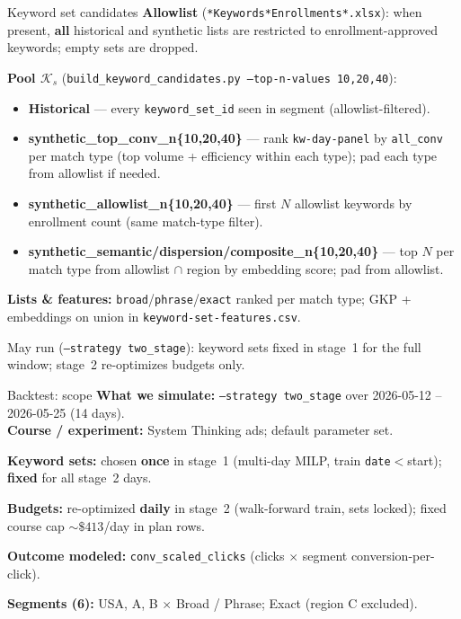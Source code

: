 \documentclass[11pt]{beamer}
\begin{document}
\begin{frame}{Keyword set candidates}
  \footnotesize
  \textbf{Allowlist} (\texttt{*Keywords*Enrollments*.xlsx}): when present, \textbf{all} historical and synthetic lists are restricted to enrollment-approved keywords; empty sets are dropped.

  \textbf{Pool $\mathcal{K}_s$} (\texttt{build\_keyword\_candidates.py --top-n-values 10,20,40}):
  \begin{itemize}
    \item \textbf{Historical} --- every \texttt{keyword\_set\_id} seen in segment (allowlist-filtered).
    \item \textbf{synthetic\_top\_conv\_n\{10,20,40\}} --- rank \texttt{kw-day-panel} by \texttt{all\_conv} per match type (top volume + efficiency within each type); pad each type from allowlist if needed.
    \item \textbf{synthetic\_allowlist\_n\{10,20,40\}} --- first $N$ allowlist keywords by enrollment count (same match-type filter).
    \item \textbf{synthetic\_semantic/dispersion/composite\_n\{10,20,40\}} --- top $N$ per match type from allowlist $\cap$ region by embedding score; pad from allowlist.
  \end{itemize}

  \textbf{Lists \& features:} \texttt{broad}/\texttt{phrase}/\texttt{exact} ranked per match type; GKP + embeddings on union in \texttt{keyword-set-features.csv}.

  {\scriptsize May run (\texttt{--strategy two\_stage}): keyword sets fixed in stage~1 for the full window; stage~2 re-optimizes budgets only.}
  \normalsize
\end{frame}

\begin{frame}{Backtest: scope}
  \textbf{What we simulate:} \texttt{--strategy two\_stage} over 2026-05-12 -- 2026-05-25 (14 days).\\
  \textbf{Course / experiment:} System Thinking ads; default parameter set.

  \vspace{0.35em}
  \textbf{Keyword sets:} chosen \textbf{once} in stage~1 (multi-day MILP, train \texttt{date}${<}$start); \textbf{fixed} for all stage~2 days.

  \vspace{0.35em}
  \textbf{Budgets:} re-optimized \textbf{daily} in stage~2 (walk-forward train, sets locked); fixed course cap ${\sim}\$413$/day in plan rows.

  \vspace{0.35em}
  \textbf{Outcome modeled:} \texttt{conv\_scaled\_clicks} (clicks $\times$ segment conversion-per-click).

  \vspace{0.35em}
  \textbf{Segments (6):} USA, A, B $\times$ Broad / Phrase; Exact (region C excluded).
\end{frame}
\end{document}
